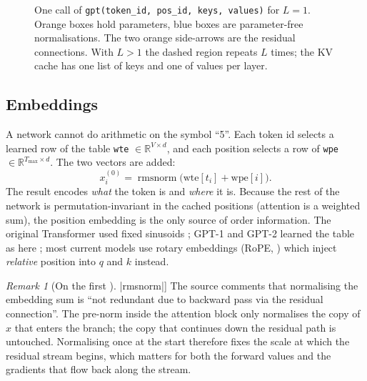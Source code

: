 \documentclass[11pt,letterpaper]{article}
\theoremstyle{remark}
\newtheorem{remark}{Remark}[section]
\newcommand{\code}[1]{\lstinline[basicstyle=\ttfamily\small]|#1|}
\newcommand{\R}{\mathbb{R}}
\newcommand{\rmsnorm}{\operatorname{rmsnorm}}
\begin{document}
\begin{figure}[p]
\caption{One call of \code{gpt(token_id, pos_id, keys, values)} for $L=1$. Orange boxes hold parameters, blue boxes are parameter-free normalisations. The two orange side-arrows are the residual connections. With $L>1$ the dashed region repeats $L$ times; the KV cache has one list of keys and one of values per layer.}
\label{fig:arch}
\end{figure}

\subsection{Embeddings}
\label{sec:embeddings}

A network cannot do arithmetic on the symbol ``5''. Each token id selects a learned row of the table \code{wte} $\in\R^{V\times d}$, and each position selects a row of \code{wpe} $\in\R^{T_{\max}\times d}$. The two vectors are added:
\begin{equation}
x^{(0)}_i = \rmsnorm\big(\mathrm{wte}[t_i] + \mathrm{wpe}[i]\big).
\end{equation}
The result encodes \emph{what} the token is and \emph{where} it is. Because the rest of the network is permutation-invariant in the cached positions (attention is a weighted sum), the position embedding is the only source of order information. The original Transformer used fixed sinusoids \parencite{vaswani2017attention}; GPT-1 and GPT-2 learned the table as here \parencite{radford2018gpt1,radford2019gpt2}; most current models use rotary embeddings (RoPE, \citeauthor{su2021rope} \citeyear{su2021rope}) which inject \emph{relative} position into $q$ and $k$ instead.

\begin{remark}[On the first \code{rmsnorm}]
The source comments that normalising the embedding sum is ``not redundant due to backward pass via the residual connection''. The pre-norm inside the attention block only normalises the copy of $x$ that enters the branch; the copy that continues down the residual path is untouched. Normalising once at the start therefore fixes the scale at which the residual stream begins, which matters for both the forward values and the gradients that flow back along the stream.
\end{remark}
\end{document}
